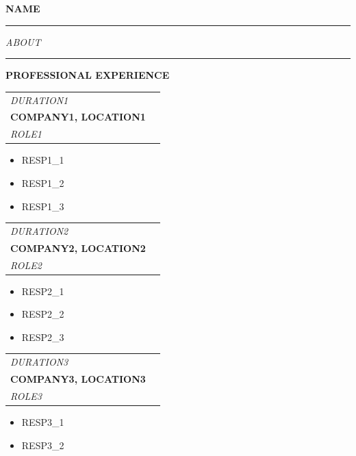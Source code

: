 \documentclass[11pt]{article}
\makeatletter
\newcommand{\resumeItem}[1]{
  \item \small{#1}\vspace{-2pt}
}
\newcommand{\resumeSection}[1]{
  \vspace{2mm}
  \par\noindent\textcolor{black}{\rule{2pt}{0.35cm}}
  \hspace{1mm}\textbf{\large #1}\par
  \vspace{1mm}
}
\newenvironment{resumeSubsection}
  {\begin{tabular*}{\textwidth}{@{\hspace{-0.5em}\extracolsep{\fill}}ll}}
  {\end{tabular*}}
\makeatother
\begin{document}
\begin{center}
    \textbf{\Huge \scshape {{{NAME}}}}
\end{center}

\vspace{-1em}
\noindent\rule{\textwidth}{2pt}
\vspace{2mm}

\vspace{-1em}
\noindent\textit{{{ABOUT}}}

\vspace{1em}

\resumeSection{PROFESSIONAL EXPERIENCE}

\vspace{1em}
\begin{resumeSubsection}
  \vspace{0.5em}
  \textit{{{DURATION1}}} \\
  \textbf{{{COMPANY1}}, {{{LOCATION1}}}} \\
  \textit{{{ROLE1}}}
\end{resumeSubsection}
\begin{itemize}
  \setlength{\leftmargin}{0.5em}
  \resumeItem{{{RESP1_1}}}
  \resumeItem{{{RESP1_2}}}
  \resumeItem{{{RESP1_3}}}
\end{itemize}

\vspace{1em}
\begin{resumeSubsection}
  \vspace{0.5em}
  \textit{{{DURATION2}}} \\
  \textbf{{{COMPANY2}}, {{{LOCATION2}}}} \\
  \textit{{{ROLE2}}}
\end{resumeSubsection}
\begin{itemize}
  \setlength{\leftmargin}{0.5em}
  \resumeItem{{{RESP2_1}}}
  \resumeItem{{{RESP2_2}}}
  \resumeItem{{{RESP2_3}}}
\end{itemize}

\vspace{1em}
\begin{resumeSubsection}
  \vspace{0.5em}
  \textit{{{DURATION3}}} \\
  \textbf{{{COMPANY3}}, {{{LOCATION3}}}} \\
  \textit{{{ROLE3}}}
\end{resumeSubsection}
\begin{itemize}
  \setlength{\leftmargin}{0.5em}
  \resumeItem{{{RESP3_1}}}
  \resumeItem{{{RESP3_2}}}
\end{itemize}
\end{document}
